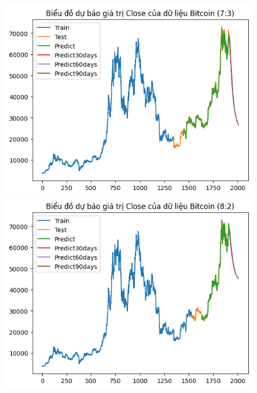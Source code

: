 \documentclass[conference]{IEEEtran}
\begin{document}
	\begin{figure}[H]
		\centering
		\begin{minipage}{0.15\textwidth}
			\centering
			\includegraphics[width=1\textwidth]{Figure/GRU_BTC_73.png}
		\end{minipage}
		\hfill
		\begin{minipage}{0.15\textwidth}
			\centering
			\includegraphics[width=1\textwidth]{Figure/GRU_BTC_82.png}
		\end{minipage}
		\hfill
		\begin{minipage}{0.15\textwidth}
			\centering

\end{minipage}
\end{figure}
\end{document}
